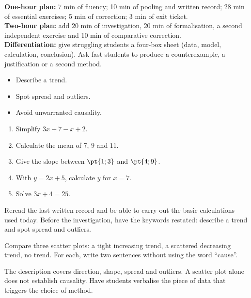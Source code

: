 \ifmxteacher
\begin{method}
\textbf{One-hour plan:} 7 min of fluency; 10 min of pooling and written record; 28 min of essential exercises; 5 min of correction; 3 min of exit ticket.\\
\textbf{Two-hour plan:} add 20 min of investigation, 20 min of formalisation, a second independent exercise and 10 min of comparative correction.\\
\textbf{Differentiation:} give struggling students a four-box sheet (data, model, calculation, conclusion). Ask fast students to produce a counterexample, a justification or a second method.
\end{method}
\fi
{}
\begin{objectives}\begin{itemize}\item Describe a trend.\item Spot spread and outliers.\item Avoid unwarranted causality.\end{itemize}\end{objectives}
\begin{fluency}\begin{enumerate}\item Simplify $3x+7-x+2$. \item Calculate the mean of $7$, $9$ and $11$. \item Give the slope between $\pt{1;3}$ and $\pt{4;9}$. \item With $y=2x+5$, calculate $y$ for $x=7$. \item Solve $3x+4=25$. \end{enumerate}\end{fluency}
\begin{prerequisites}Reread the last written record and be able to carry out the basic calculations used today. Before the investigation, have the keywords restated: describe a trend and spot spread and outliers.\end{prerequisites}

\begin{activity}
Compare three scatter plots: a tight increasing trend, a scattered decreasing trend, no trend. For each, write two sentences without using the word ``cause''.

\end{activity}
\begin{solution}The description covers direction, shape, spread and outliers. A scatter plot alone does not establish causality. Have students verbalise the piece of data that triggers the choice of method.\end{solution}

